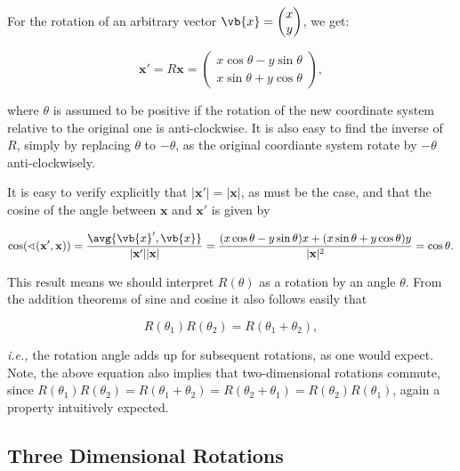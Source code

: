 \documentclass[a4paper,12pt]{report}
\begin{document}
For the rotation of an arbitrary vector \(\vb{x} = \begin{pmatrix}
     x \\
     y \\
\end{pmatrix}\), we get:

\begin{equation}
\mathbf{x}' = R\mathbf{x} = \begin{pmatrix} x \cos \theta - y \sin \theta \\ x \sin \theta + y \cos \theta \end{pmatrix},
\end{equation}

where \(\theta \) is assumed to be positive if the rotation of the new coordinate system relative to the original one is anti-clockwise. It is also easy to find the inverse of \(R\), simply by replacing \(\theta \) to \(- \theta \), as the original coordiante system rotate by \(- \theta \) anti-clockwisely.     

It is easy to verify explicitly that \(|\mathbf{x}'| = |\mathbf{x}|\), as must be the case, and that the cosine of the angle between \(\mathbf{x}\) and \(\mathbf{x}'\) is given by

\begin{equation}
\cos(\sphericalangle (\mathbf{x}', \mathbf{x} )) = \frac{\avg{\vb{x} ',\vb{x} } }{|\mathbf{x}'||\mathbf{x}|} = \frac{(x \cos \theta - y \sin \theta)x + (x \sin \theta + y \cos \theta)y}{|\mathbf{x}|^2} = \cos \theta.
\end{equation}

This result means we should interpret \(R(\theta)\) as a rotation by an angle \(\theta\). From the addition theorems of sine and cosine it also follows easily that

\begin{equation}
R(\theta_1)R(\theta_2) = R(\theta_1 + \theta_2),
\end{equation}

\textit{i.e.,} the rotation angle adds up for subsequent rotations, as one would expect. Note, the above equation also implies that two-dimensional rotations commute, since \(R(\theta_1)R(\theta_2) = R(\theta_1 + \theta_2) = R(\theta_2 + \theta_1) = R(\theta_2)R(\theta_1)\), again a property intuitively expected.

\subsection{Three Dimensional Rotations}
\end{document}
